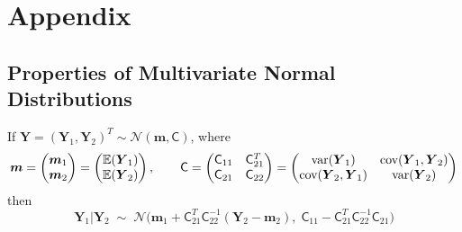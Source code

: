 \documentclass[twocolumn]{svjour3}          %
\newcommand{\bm}[1]{\boldsymbol{#1}}
\newcommand{\Ex}{\mathbb{E}}
\newcommand{\vm}{\bm{m}}
\newcommand{\vY}{\bm{Y}}
\newcommand{\mC}{\mathsf{C}}
\newcommand{\cov}{{\textup{cov}}}
\newcommand{\var}{{\textup{var}}}
\newcommand{\calN}{\mathcal{N}}
\begin{document}
\section{Appendix}

\subsection{Properties of Multivariate Normal Distributions}


\begin{lemma} \label{thrm:condDist} If $\vY = (\vY_1, \vY_2)^T \sim \calN (\vm,\mC)$, where 
	\begin{equation*}
	\vm = \begin{pmatrix} \vm_1 \\ \vm_2 \end{pmatrix} = \begin{pmatrix} \Ex(\vY_1) \\ \Ex(\vY_2) \end{pmatrix}, \qquad 
	\mC = \begin{pmatrix}
	\mC_{11} & \mC_{21}^T \\ 	\mC_{21} & \mC_{22}
	\end{pmatrix} =
	 \begin{pmatrix}
	\var(\vY_{1}) & \cov(\vY_{1}, \vY_2) \\ 	\cov(\vY_2,\vY_{1}) & \var(\vY_{2})
	\end{pmatrix} 
	\end{equation*}
	then 
	\begin{equation*}
	\vY_1 \vert \vY_2 \; \sim \; \calN \bigl(\vm_1 + \mC_{21}^T \mC_{22}^{-1}(\vY_2 - \vm_2), \; \mC_{11} - \mC_{21}^T \mC_{22}^{-1} \mC_{21} \bigr)
	\end{equation*}
	
\end{lemma}
\end{document}
